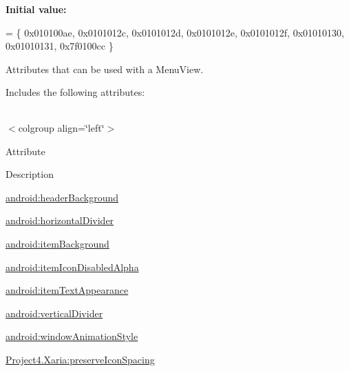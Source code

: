 {\bfseries Initial value\+:}
\begin{DoxyCode}
= \{
            0x010100ae, 0x0101012c, 0x0101012d, 0x0101012e,
            0x0101012f, 0x01010130, 0x01010131, 0x7f0100cc
        \}
\end{DoxyCode}
Attributes that can be used with a Menu\+View. 

Includes the following attributes\+:

\tabulinesep=1mm
\begin{longtabu} spread 0pt [c]{*{0}{|X[-1]}|}
\hline
\end{longtabu}
$<$colgroup align=\char`\"{}left\char`\"{}$>$ 

Attribute

Description 

{\ttfamily \hyperlink{classproject4_1_1xaria_1_1R_1_1styleable_a1c95fec75ad396df1e8fe40acc009779}{android\+:header\+Background}}

{\ttfamily \hyperlink{classproject4_1_1xaria_1_1R_1_1styleable_ac8dce77f204832af3ea731716ca38877}{android\+:horizontal\+Divider}}

{\ttfamily \hyperlink{classproject4_1_1xaria_1_1R_1_1styleable_a2571658608ce1d5d8a959d3f06dc952d}{android\+:item\+Background}}

{\ttfamily \hyperlink{classproject4_1_1xaria_1_1R_1_1styleable_a33cd80d140efb3245ac24e8c44d445d0}{android\+:item\+Icon\+Disabled\+Alpha}}

{\ttfamily \hyperlink{classproject4_1_1xaria_1_1R_1_1styleable_a3d955c47903c9650c0f2722cc42904cb}{android\+:item\+Text\+Appearance}}

{\ttfamily \hyperlink{classproject4_1_1xaria_1_1R_1_1styleable_ac550192a3b9eed5ec97313a89b3f93b9}{android\+:vertical\+Divider}}

{\ttfamily \hyperlink{classproject4_1_1xaria_1_1R_1_1styleable_ab594d20426da891ee4202ce7515875cd}{android\+:window\+Animation\+Style}}

{\ttfamily \hyperlink{classproject4_1_1xaria_1_1R_1_1styleable_a49472a6360fcdd0f2b8713f71f079e51}{Project4.\+Xaria\+:preserve\+Icon\+Spacing}}

